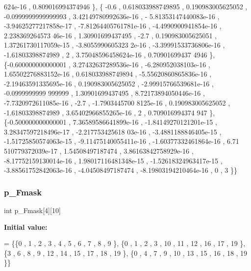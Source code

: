 \begin{DoxyCode}
      624e-16 , 0.809016994374946 \},
\{             -0.6 , 0.618033988749895 , 0.190983005625052 , -0.0999999999999993 , 3.42149780992636e-16 , -
      5.81353147440083e-16 , -3.94625277217858e-17 , -7.81264405761781e-16 , -4.4990900941854e-16 , 2.238369264573
      46e-16 ,  1.30901699437495 ,              -2.7 , 0.190983005625051 , 1.37261730117059e-15 , -3.8055990605323
      2e-16 , -3.39991533736806e-16 , -1.61803398874989 ,                 2 , 3.75048596458624e-16 , 0.70901699437
      4946 \},
\{-0.600000000000001 , 3.27432637289536e-16 , -6.280952038103e-16 , 1.65502276883152e-16 , 0.618033988749894
       , -5.55620860865836e-16 , -2.19463591335695e-16 , 0.190983005625052 , -2.99915766539681e-16 , -0.0999999999
      999999 ,  1.30901699437495 , 8.72173894050446e-16 , -7.7320972611085e-16 ,              -2.7 , -1.7903445700
      8125e-16 , 0.190983005625052 , -1.61803398874989 , 3.65402966855265e-16 ,                 2 , 0.709016994374
      947 \},
\{-0.500000000000001 , 7.36589586641899e-16 , -1.84149270121201e-15 , 3.28347597218496e-17 , -2.217753425618
      03e-16 , -3.4881188846405e-15 , -1.51725850574063e-15 , -9.11475140055411e-16 , -1.60377332461864e-16 , 6.71
      510779372039e-17 ,  1.54508497187474 , 3.86163842758929e-16 , -8.17752159130014e-16 , 1.98017116481348e-15 ,
       -1.52618324963417e-15 , -3.88561752842063e-16 , -4.04508497187474 , -8.19803194210464e-16 ,                
       0 ,                 3 \}\}
\end{DoxyCode}
\mbox{\label{a00485_a016245a10ef947f0ff48b788cbf58785}} 
\subsubsection{\texorpdfstring{p\+\_\+\+Fmask}{p\_Fmask}}
{\footnotesize\ttfamily int p\+\_\+\+Fmask\mbox{[}4\mbox{]}\mbox{[}10\mbox{]}}

{\bfseries Initial value\+:}
\begin{DoxyCode}
= \{\{0 , 1 , 2 , 3 , 4 , 5 , 6 , 7 , 8 , 9 \},
\{0 , 1 , 2 , 3 , 10 , 11 , 12 , 16 , 17 , 19 \},
\{3 , 6 , 8 , 9 , 12 , 14 , 15 , 17 , 18 , 19 \},
\{0 , 4 , 7 , 9 , 10 , 13 , 15 , 16 , 18 , 19 \}\}
\end{DoxyCode}
\mbox{\label{a00485_a9ce8ebb2859cefaaf8643b775272767f}} 
